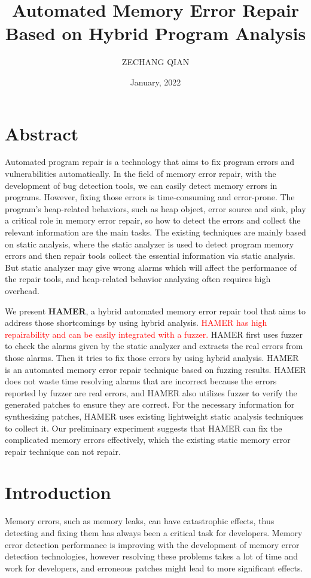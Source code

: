 \documentclass[a4paper,11pt,oneside,openany]{book}
\title{Automated Memory Error Repair\\Based on Hybrid Program Analysis}
\author{ZECHANG QIAN}
\affiliation{%
  Graduate Major in Computer Science\\
  School of Computing\\
  Tokyo Institute of Technology}
\date{January, 2022}
\begin{document}
\frontmatter
\maketitle

\chapter{Abstract}
Automated program repair is a technology that aims to fix program errors and vulnerabilities automatically. In the field of memory error repair, with the development of bug detection tools, we can easily detect memory errors in programs. However, fixing those errors is time-consuming and error-prone. The program's heap-related behaviors, such as heap object, error source and sink, play a critical role in memory error repair, so how to detect the errors and collect the relevant information are the main tasks. The existing techniques are mainly based on static analysis, where the static analyzer is used to detect program memory errors and then repair tools collect the essential information via static analysis. But static analyzer may give wrong alarms which will affect the performance of the repair tools, and heap-related behavior analyzing often requires high overhead. 

We present \textbf{HAMER}, a hybrid automated memory error repair tool that aims to address those 
shortcomings by using hybrid analysis. \textcolor{red}{HAMER has high repairability and can be easily integrated with a fuzzer.} HAMER first uses fuzzer to check the alarms given by the static 
analyzer and extracts the real errors from those alarms. Then it tries to fix those errors by using 
hybrid analysis. HAMER is an automated memory error repair technique based on fuzzing results. HAMER does not waste time resolving alarms that are incorrect because the errors reported by fuzzer are real errors, and HAMER also utilizes fuzzer to verify the generated patches to ensure they are correct. For the necessary information for synthesizing patches, HAMER uses existing lightweight static analysis techniques to collect it. Our preliminary experiment suggests that HAMER can fix the complicated memory errors effectively, which the existing static memory error repair technique can not repair.


\tableofcontents
\listoffigures
\listoftables


\mainmatter
\chapter{Introduction}
Memory errors, such as memory leaks, can have catastrophic effects,  thus detecting and fixing them has always been a critical task for developers. Memory error detection performance is improving with the development of memory error detection technologies, however resolving these problems takes a lot of time and work for developers, and erroneous patches might lead to more significant effects.
\end{document}
